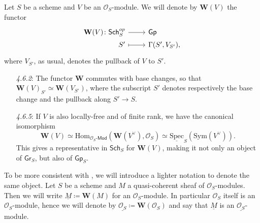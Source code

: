 \documentclass[../Main]{subfiles}
\begin{document}
\begin{defn}
	Let $S$ be a scheme and $V$ be an $\mathcal{O}_{ S }$-module.
	We will denote by $\mathbf{W}(V)$ the functor
	\begin{equation*}
	\begin{tikzcd}[row sep = 0ex
		,/tikz/column 1/.append style={anchor=base east}
		,/tikz/column 2/.append style={anchor=base west}]
		\mathbf{W}(V)\colon 
		\mathsf{Sch}_{ S }^{op} \arrow[r, "", rightarrow] &
		\mathsf{Gp} \\
		S' \arrow[r, "", mapsto] & 
		\Gamma(S', V_{S'})
	,\end{tikzcd}
	\end{equation*} 
	where $V_{S'}$, as usual, denotes the pullback of
	$V$ to $S'$.
\end{defn}


\begin{rem}\leavevmode\vspace{-1.2\baselineskip}
\begin{enumerate}
\item[{\em 4.6.2}:]
	The functor $\mathbf{W}$ commutes with base changes,
	so that $\mathbf{W}(V)_{S'} \simeq \mathbf{W}(V_{S'})$,
	where the subscript $S'$ denotes respectively the base change 
	and the pullback along $S' \to S$.

\item[{\em 4.6.5}:]
	If $V$ is also  locally-free and of finite rank, we have the canonical isomorphism
	\begin{equation*}
		\mathbf{W}(V) \simeq
		\mathrm{Hom}_{ \mathcal{O}_{ S }\text{-}\mathsf{Mod} }
		\left(\mathbf{W}(V^\vee) , \mathcal{O}_{ S } \right) \simeq
		\underline{\mathrm{Spec}}_S(\mathrm{Sym}(V^\vee))
	.\end{equation*}
	This gives a representative in $\mathsf{Sch}_{ S }$ for 
	$\mathbf{W}(V)$, making it not only an object of $\mathsf{Gr}_S$, but
	also of $\mathsf{Gp}_S$.
\end{enumerate}
\end{rem}


\begin{ntt}\label{not:fppfOsModule}
	To be more consistent with \cite{Messing}, we will introduce a 
	lighter notation to denote the same object.
	Let $S$ be a scheme and $M$ a quasi-coherent sheaf of $\mathcal{O}_{ S }$-modules.
	Then we will write $\underline{M} \coloneqq \mathbf{W}(M)$ for
	an $\mathcal{O}_{ S }$-module.
	In particular $\mathcal{O}_{ S }$ itself is an $\mathcal{O}_{ S }$-module, hence
	we will denote by $\underline{\mathcal{O}_{ S }} \coloneqq \mathbf{W}(\mathcal{O}_{ S })$
	and say that $\underline{M}$ is an $\underline{\mathcal{O}_{ S }}$-module.
\end{ntt}
\end{document}
